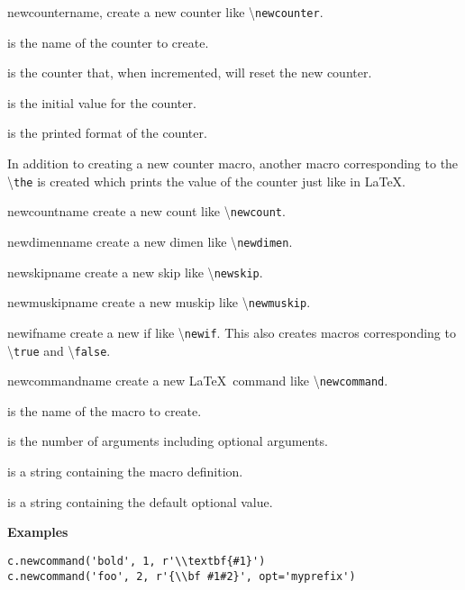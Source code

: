 \documentclass{manual}
\newcommand{\macro}[1]{\textbackslash\texttt{#1}}
\begin{document}
\begin{methoddesc}[Context]{newcounter}{name, }
create a new counter like \macro{newcounter}.

 is the name of the counter to create.

 is the counter that, when incremented, will reset the 
new counter.

 is the initial value for the counter.

 is the printed format of the counter.

In addition to creating a new counter macro, another macro corresponding
to the \macro{the} is created which prints the value of the
counter just like in \LaTeX.
\end{methoddesc}

\begin{methoddesc}[Context]{newcount}{name}
create a new count like \macro{newcount}.
\end{methoddesc}

\begin{methoddesc}[Context]{newdimen}{name}
create a new dimen like \macro{newdimen}.
\end{methoddesc}

\begin{methoddesc}[Context]{newskip}{name}
create a new skip like \macro{newskip}.
\end{methoddesc}

\begin{methoddesc}[Context]{newmuskip}{name}
create a new muskip like \macro{newmuskip}.
\end{methoddesc}

\begin{methoddesc}[Context]{newif}{name}
create a new if like \macro{newif}.  This also creates macros corresponding
to \macro{true} and \macro{\var{name}false}.
\end{methoddesc}

\begin{methoddesc}[Context]{newcommand}{name}
create a new \LaTeX\ command like \macro{newcommand}.

 is the name of the macro to create.

 is the number of arguments including optional arguments.

 is a string containing the macro definition.

 is a string containing the default optional value.

\textbf{Examples}
\begin{verbatim}
c.newcommand('bold', 1, r'\\textbf{#1}')
c.newcommand('foo', 2, r'{\\bf #1#2}', opt='myprefix')
\end{verbatim}
\end{methoddesc}
\end{document}
